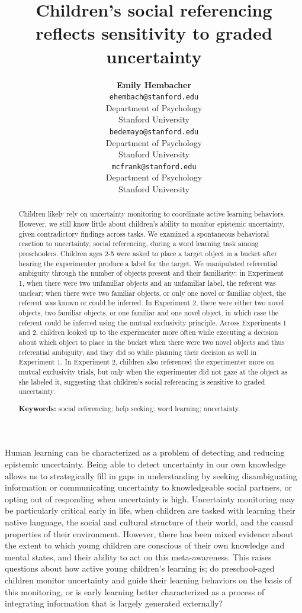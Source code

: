 \documentclass[10pt, letterpaper]{article}
\title{Children's social referencing reflects sensitivity to graded uncertainty}
\author{{\large \bf Emily  Hembacher} \\ \texttt{ehembach@stanford.edu} \\ Department of Psychology \\ Stanford University \And {\large \bf Benjamin deMayo} \\ \texttt{bedemayo@stanford.edu} \\ Department of Psychology \\ Stanford University \And {\large \bf Michael C. Frank} \\ \texttt{mcfrank@stanford.edu} \\ Department of Psychology \\ Stanford University}
\begin{document}
\maketitle

\begin{abstract}
Children likely rely on uncertainty monitoring to coordinate active
learning behaviors. However, we still know little about children's
ability to monitor epistemic uncertainty, given contradictory findings
across tasks. We examined a spontaneous behavioral reaction to
uncertainty, social referencing, during a word learning task among
preschoolers. Children ages 2-5 were asked to place a target object in a
bucket after hearing the experimenter produce a label for the target. We
manipulated referential ambiguity through the number of objects present
and their familiarity: in Experiment 1, when there were two unfamiliar
objects and an unfamiliar label, the referent was unclear; when there
were two familiar objects, or only one novel or familiar object, the
referent was known or could be inferred. In Experiment 2, there were
either two novel objects, two familiar objects, or one familiar and one
novel object, in which case the referent could be inferred using the
mutual exclusivity principle. Across Experiments 1 and 2, children
looked up to the experimenter more often while executing a decision
about which object to place in the bucket when there were two novel
objects and thus referential ambiguity, and they did so while planning
their decision as well in Experiment 1. In Experiment 2, children also
referenced the experimenter more on mutual exclusivity trials, but only
when the experimenter did not gaze at the object as she labeled it,
suggesting that children's social referencing is sensitive to graded
uncertainty.

\textbf{Keywords:}
social referencing; help seeking; word learning; uncertainty.
\end{abstract}

Human learning can be characterized as a problem of detecting and
reducing epistemic uncertainty. Being able to detect uncertainty in our
own knowledge allows us to strategically fill in gaps in understanding
by seeking disambiguating information or communicating uncertainty to
knowledgeable social partners, or opting out of responding when
uncertainty is high. Uncertainty monitoring may be particularly critical
early in life, when children are tasked with learning their native
language, the social and cultural structure of their world, and the
causal properties of their environment. However, there has been mixed
evidence about the extent to which young children are conscious of their
own knowledge and mental states, and their ability to act on this
meta-awareness. This raises questions about how active young children's
learning is; do preschool-aged children monitor uncertainty and guide
their learning behaviors on the basis of this monitoring, or is early
learning better characterized as a process of integrating information
that is largely generated externally?
\end{document}
